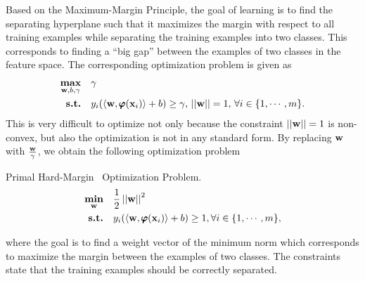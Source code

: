 {Based on the Maximum-Margin Principle, the goal of learning is to find the separating hyperplane such that it maximizes the margin with respect to all training examples while separating the training examples into two classes.
This corresponds to finding a ``big gap'' between the examples of two classes in the feature space.
The corresponding optimization problem \citep{Bishop07} is given as
\begin{align*}
	\underset{\mathbf {w},b,\gamma}{\textbf{max}} &\quad \gamma\\
	\textbf{s.t.} &\quad y_i(\langle \mathbf {w}, \pmb \varphi(\mathbf {x}_i) \rangle+b) \ge \gamma, \, \left|\left| \mathbf {w} \right|\right|=1, \, \forall i\in\{1,\cdots,m\}.
\end{align*}
This is very difficult to optimize not only because the constraint $\left|\left| \mathbf {w} \right|\right|=1$ is non-convex, but also the optimization is not in any standard form.
By replacing $\mathbf {w}$ with $\frac{\mathbf {w}}{\gamma}$, we obtain the following optimization problem

\begin{definition}{Primal Hard-Margin \svm\ Optimization Problem.}\label{hardsvmprimal}
	\begin{align*}
		\underset{\mathbf {w}}{\textbf{min}} & \quad\frac{1}{2}\left|\left| \mathbf {w} \right|\right|^2\\
		\textbf{s.t.} & \quad y_i(\langle \mathbf {w}, \pmb \varphi(\mathbf {x}_i) \rangle + b) \ge 1, \forall i\in\{1,\cdots,m\},
	\end{align*}
\end{definition}
\noindent
where the goal is to find a weight vector of the minimum norm which corresponds to maximize the margin between the examples of two classes.
The constraints state that the training examples should be correctly separated.

}

